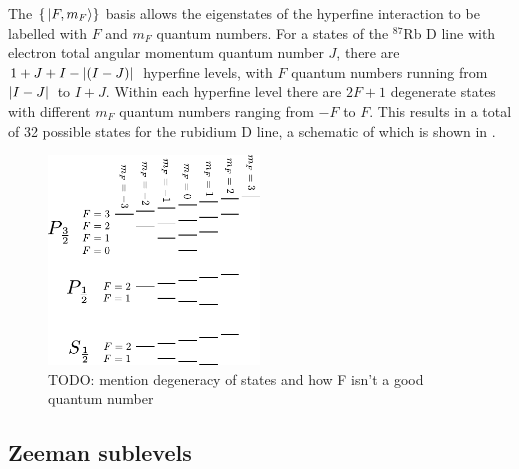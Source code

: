 The $\{\ket{F, m_F}\}$ basis allows the eigenstates of the hyperfine interaction to be labelled with $F$ and $m_F$ quantum numbers. For a states of the $^{87}$Rb D line with electron total angular momentum quantum number $J$, there are $1+J+I - \abs{(I - J)}$ hyperfine levels, with $F$ quantum numbers running from $\abs{I - J}$ to $I + J$. Within each hyperfine level there are $2F + 1$ degenerate states with different $m_F$ quantum numbers ranging from $-F$ to $F$. This results in a total of 32 possible states for the rubidium D line, a schematic of which is shown in .

\begin{figure}%
\begin{center}
\includegraphics[width=0.5\textwidth]{figures/atomic_physics/D_line.pdf}
\caption{TODO: mention degeneracy of states and how F isn't a good quantum number}\label{fig:D_line}
\end{center}
\end{figure}


\subsection{Zeeman sublevels}

